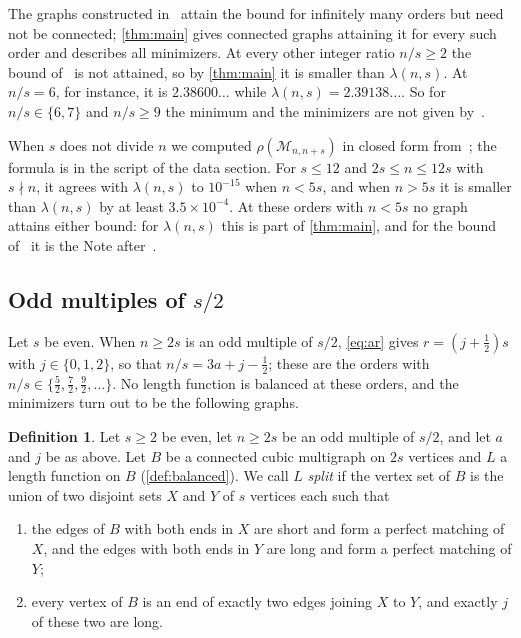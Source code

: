 \documentclass[11pt]{article}
\theoremstyle{definition}
\newtheorem{definition}[theorem]{Definition}
\theoremstyle{remark}
\begin{document}
The graphs constructed in~\cite[Theorem~1.7]{BEH}
attain the bound for infinitely many orders but need not be connected; \cref{thm:main} gives connected graphs attaining
it for every such order and describes all minimizers. At every other integer ratio $n/s\ge2$ the bound of~\cite{BEH} is not attained, so by \cref{thm:main} it is
smaller than $\lambda(n,s)$. At $n/s=6$, for instance, it is $2.38600\dots$ while $\lambda(n,s)=2.39138\dots$. So for
$n/s\in\{6,7\}$ and $n/s\ge9$ the minimum and the minimizers are not given by~\cite{BEH}.

When $s$ does not divide $n$ we computed $\rho(\mathcal M_{n,n+s})$ in closed form from~\cite[Theorems~1.4
and~1.5]{BEH}; the formula is in the script of the data section. For $s\le12$ and $2s\le n\le12s$ with $s\nmid n$, it agrees with $\lambda(n,s)$ to $10^{-15}$
when $n<5s$, and when $n>5s$ it is smaller than $\lambda(n,s)$ by at least $3.5\times10^{-4}$. At these orders with
$n<5s$ no graph attains either bound: for $\lambda(n,s)$ this is part of \cref{thm:main}, and for the bound
of~\cite{BEH} it is the Note after~\cite[Theorem~1.7]{BEH}.

\subsection{Odd multiples of \texorpdfstring{$s/2$}{s/2}}\label{sec:halfresult}

Let $s$ be even. When $n\ge2s$ is an odd multiple of $s/2$, \eqref{eq:ar} gives $r=(j+\frac12)s$ with $j\in\{0,1,2\}$,
so that $n/s=3a+j-\frac12$; these are the orders with $n/s\in\{\frac52,\frac72,\frac92,\dots\}$. No length function is
balanced at these orders, and the minimizers turn out to be the following graphs.

\begin{definition}\label{def:half}
Let $s\ge2$ be even, let $n\ge2s$ be an odd multiple of $s/2$, and let $a$ and $j$ be as above. Let $B$ be a connected
cubic multigraph on $2s$ vertices and $L$ a length function on $B$ (\cref{def:balanced}). We call $L$ \emph{split} if
the vertex set of $B$ is the union of two disjoint sets $X$ and $Y$ of $s$ vertices each such that
\begin{enumerate}[label=(\roman*)]
\item the edges of $B$ with both ends in $X$ are short and form a perfect matching of $X$, and the edges with both ends
in $Y$ are long and form a perfect matching of $Y$;
\item every vertex of $B$ is an end of exactly two edges joining $X$ to $Y$, and exactly $j$ of these two are long.
\end{enumerate}
\end{definition}
\end{document}
